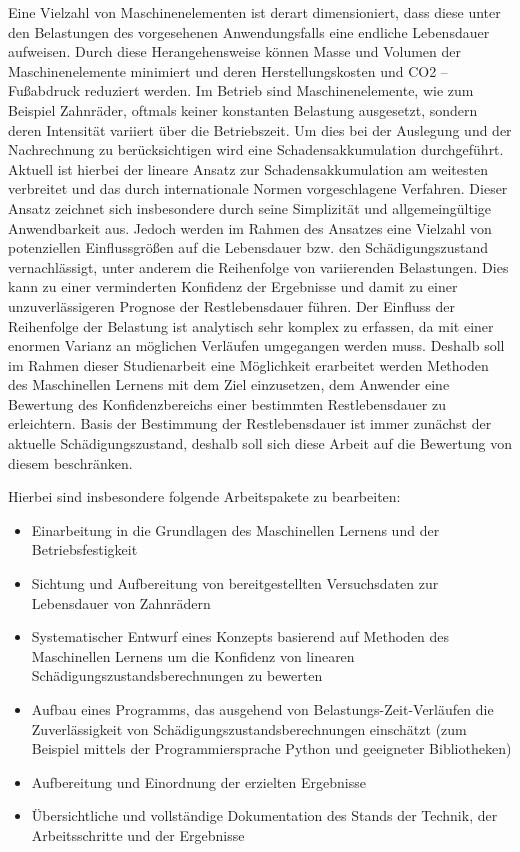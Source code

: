 Eine Vielzahl von Maschinenelementen ist derart dimensioniert, dass diese unter den Belastungen des vorgesehenen Anwendungsfalls eine endliche Lebensdauer aufweisen. Durch diese Herangehensweise können Masse und Volumen der Maschinenelemente minimiert und deren Herstellungskosten und CO2 – Fußabdruck reduziert werden.
Im Betrieb sind Maschinenelemente, wie zum Beispiel Zahnräder, oftmals keiner konstanten Belastung ausgesetzt, sondern deren Intensität variiert über die Betriebszeit. Um dies bei der Auslegung und der Nachrechnung zu berücksichtigen wird eine Schadensakkumulation durchgeführt. Aktuell ist hierbei der lineare Ansatz zur Schadensakkumulation am weitesten verbreitet und das durch internationale Normen vorgeschlagene Verfahren. Dieser Ansatz zeichnet sich insbesondere durch seine Simplizität und allgemeingültige Anwendbarkeit aus. Jedoch werden im Rahmen des Ansatzes eine Vielzahl von potenziellen Einflussgrößen auf die Lebensdauer bzw. den Schädigungszustand vernachlässigt, unter anderem die Reihenfolge von variierenden Belastungen. Dies kann zu einer verminderten Konfidenz der Ergebnisse und damit zu einer unzuverlässigeren Prognose der Restlebensdauer führen.
Der Einfluss der Reihenfolge der Belastung ist analytisch sehr komplex zu erfassen, da mit einer enormen Varianz an möglichen Verläufen umgegangen werden muss. Deshalb soll im Rahmen dieser Studienarbeit eine Möglichkeit erarbeitet werden Methoden des Maschinellen Lernens mit dem Ziel einzusetzen, dem Anwender eine Bewertung des Konfidenzbereichs einer bestimmten Restlebensdauer zu erleichtern. Basis der Bestimmung der Restlebensdauer ist immer zunächst der aktuelle Schädigungszustand, deshalb soll sich diese Arbeit auf die Bewertung von diesem beschränken.


Hierbei sind insbesondere folgende Arbeitspakete zu bearbeiten:

\begin{itemize}
   \item Einarbeitung in die Grundlagen des Maschinellen Lernens und der Betriebsfestigkeit
   \item Sichtung und Aufbereitung von bereitgestellten Versuchsdaten zur Lebensdauer von Zahnrädern
   \item Systematischer Entwurf eines Konzepts basierend auf Methoden des Maschinellen Lernens um die Konfidenz von linearen Schädigungszustandsberechnungen zu bewerten
   \item Aufbau eines Programms, das ausgehend von Belastungs-Zeit-Verläufen die Zuverlässigkeit von Schädigungszustandsberechnungen einschätzt (zum Beispiel mittels der Programmiersprache Python und geeigneter Bibliotheken)
   \item Aufbereitung und Einordnung der erzielten Ergebnisse
   \item Übersichtliche und vollständige Dokumentation des Stands der Technik, der Arbeitsschritte und der Ergebnisse
\end{itemize}